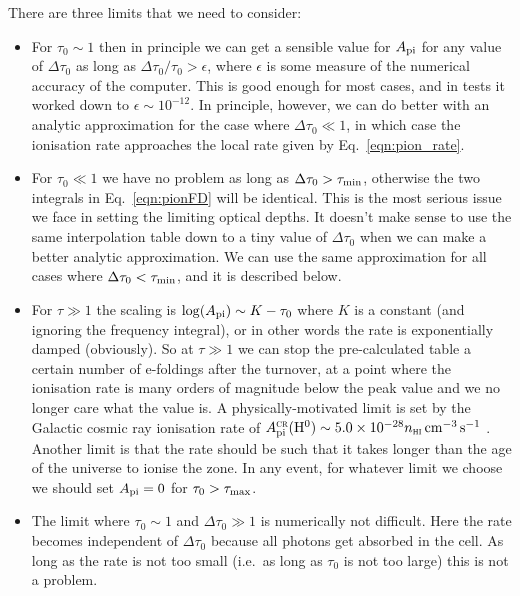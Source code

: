 \documentclass[a4paper,11pt]{article}
\begin{document}
There are three limits that we need to consider:
\begin{itemize}
\item
  For $\tau_0\sim1$ then in principle we can get a sensible value for $A_{\mathrm{pi}}$ for any value of $\Delta\tau_0$ as long as $\Delta\tau_0/\tau_0>\epsilon$, where $\epsilon$ is some measure of the numerical accuracy of the computer.
  This is good enough for most cases, and in tests it worked down to $\epsilon\sim10^{-12}$.
  In principle, however, we can do better with an analytic approximation for the case where $\Delta\tau_0\ll1$, in which case the ionisation rate approaches the local rate given by Eq.~\ref{eqn:pion_rate}.
%
\item
  For $\tau_0\ll1$ we have no problem as long as $\Delta\tau_0>\tau_{\mathrm{min}}$, otherwise the two integrals in Eq.~\ref{eqn:pionFD} will be identical.
  This is the most serious issue we face in setting the limiting optical depths.
  It doesn't make sense to use the same interpolation table down to a tiny value of $\Delta\tau_0$ when we can make a better analytic approximation.
  We can use the same approximation for all cases where $\Delta\tau_0<\tau_{\mathrm{min}}$, and it is described below.
%
\item
  For $\tau\gg1$ the scaling is $\log(A_{\mathrm{pi}})\sim K - \tau_0$ where $K$ is a constant (and ignoring the frequency integral), or in other words the rate is exponentially damped (obviously).
  So at $\tau\gg1$ we can stop the pre-calculated table a certain number of e-foldings after the turnover, at a point where the ionisation rate is many orders of magnitude below the peak value and we no longer care what the value is.
  A physically-motivated limit is set by the Galactic cosmic ray ionisation rate of $A_{\mathrm{pi}}^{\textsc{cr}}(\mathrm{H}^0)\sim 5.0\times10^{-28}n_{\textsc{hi}} \,\mathrm{cm}^{-3}\,\mathrm{s}^{-1}$ \citep[e.g.][]{HenArtDeCEA09}.
  Another limit is that the rate should be such that it takes longer than the age of the universe to ionise the zone.
  In any event, for whatever limit we choose we should set $A_{\mathrm{pi}}=0$ for $\tau_0>\tau_{\mathrm{max}}$.
%
\item
  The limit where $\tau_0\sim1$ and $\Delta\tau_0\gg1$ is numerically not difficult.
  Here the rate becomes independent of $\Delta\tau_0$ because all photons get absorbed in the cell.
  As long as the rate is not too small (i.e.~as long as $\tau_0$ is not too large) this is not a problem.
%
\end{itemize}
\end{document}
